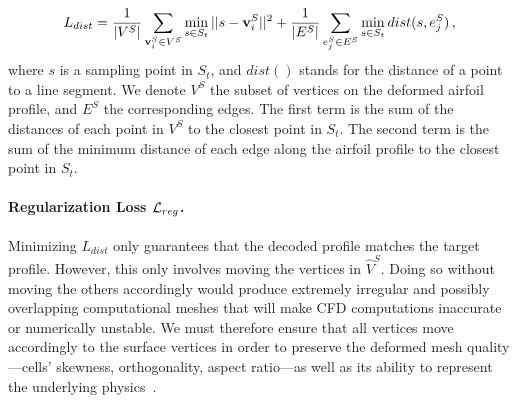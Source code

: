 \begin{equation}
    L_{dist} = \frac{1}{|V^S|} \sum\limits_{\mathbf{v}_i^S \in {V^S}} {\mathop {\min }\limits_{s \in S_t} ||s - \mathbf{v}_i^S|{|^2}}  + \frac{1}{|E^S|} \sum\limits_{e_j^S \in {E^S}} {\mathop {\min }\limits_{s \in S_t} } \, dist(s,e_j^S) \, ,
\end{equation}
%
where $s$ is a sampling point in $S_t$, and $dist()$ stands for the distance of a point to a line segment. 
We denote $V^S$ the subset of vertices on the deformed airfoil profile, and $E^S$ the corresponding edges.
The first term is the sum of the distances of each point in $V^S$ to the closest point in $S_t$. The second term is the sum of the minimum distance of each edge along the airfoil profile to the closest point in $S_t$. 

\paragraph{Regularization Loss  $\mathcal{L}_{reg}$.}

Minimizing $L_{dist}$ only guarantees that the decoded profile matches the target profile.  However, this only involves moving the vertices in  $\hat{V}^S$. Doing so without moving the others accordingly would produce extremely irregular and possibly overlapping computational meshes that will make CFD computations inaccurate or numerically unstable. We must therefore ensure that all vertices move accordingly to the surface vertices in order to preserve the deformed mesh quality---cells' skewness, orthogonality, aspect ratio---as well as its ability to represent the underlying physics~\cite{aa.Knupp2007}. 



